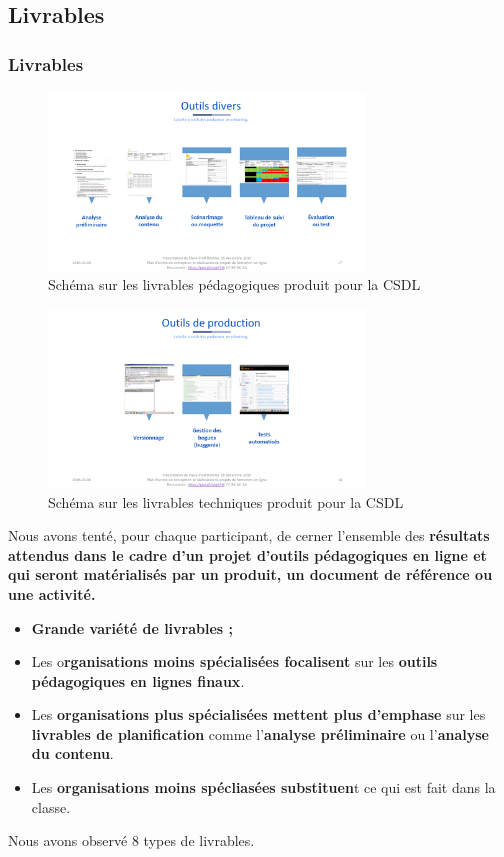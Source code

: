 						 \subsection{Livrables} 
						\begin{frame}[allowframebreaks]
						\frametitle{Livrables}
						\begin{figure}
                     			\centering
                    			 \includegraphics[width = 0.75\textwidth]{livrables1.png}
                     			\caption{\tiny{Schéma sur les livrables pédagogiques produit pour la CSDL}}
                   			\end{figure}
                   			\begin{figure}
                     			\centering
                    			 \includegraphics[width = 0.75\textwidth]{livrables2.png}
                     			\caption{\tiny{Schéma sur les livrables techniques produit pour la CSDL}}
                   			\end{figure}
                   			
                        			Nous avons tenté, pour chaque participant, de cerner l’ensemble des \textbf{résultats attendus dans le cadre d’un projet d’outils pédagogiques en ligne et qui seront matérialisés par un produit, un document de référence ou une activité.}
						\begin{itemize}
							\item \textbf{Grande variété de livrables ;}
							\item Les o\textbf{rganisations moins spécialisées focalisent} sur les \textbf{outils pédagogiques en lignes finaux}.
							\item Les \textbf{organisations plus spécialisées mettent plus d'emphase} sur les \textbf{livrables de planification} comme l'\textbf{analyse préliminaire} ou l'\textbf{analyse du contenu}.
							\item Les \textbf{organisations moins spécliasées substituen}t ce qui est fait dans la classe.
						\end{itemize}		
						Nous avons observé 8 types de livrables.
						

\end{frame}
